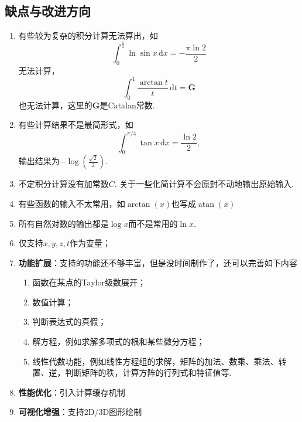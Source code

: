 \documentclass[UTF8,12pt]{ctexart}
\begin{document}
	\subsection{缺点与改进方向}
	\begin{enumerate}
		\item 有些较为复杂的积分计算无法算出，如\[\int_0^{\frac{\pi}2}\ln\sin x\,\mathrm dx=-\frac{\pi\ln 2}2\]无法计算，\[\int_0^1\frac{\arctan t}{t}\,\mathrm dt=\boldsymbol{G}\]也无法计算，这里的$\boldsymbol{G}$是Catalan常数. 
		\item 有些计算结果不是最简形式，如\[\int_0^{\pi/4}\tan x\,\mathrm dx=\frac{\ln 2}2,\]输出结果为$-\log\left(\frac{\sqrt2}2\right).$
		\item 不定积分计算没有加常数$C$.  关于一些化简计算不会原封不动地输出原始输入. 
		\item 有些函数的输入不太常用，如$\arctan(x)$也写成$\operatorname{atan}(x)$
		\item 所有自然对数的输出都是$\log x$而不是常用的$\ln x$.
		\item 仅支持$x,y,z,t$作为变量； 
		\item \textbf{功能扩展}：支持的功能还不够丰富，但是没时间制作了，还可以完善如下内容\begin{enumerate}
			\item 函数在某点的Taylor级数展开；
			\item 数值计算；
			\item 判断表达式的真假；
			\item 解方程，例如求解多项式的根和某些微分方程；
			\item 线性代数功能，例如线性方程组的求解，矩阵的加法、数乘、乘法、转置、逆，判断矩阵的秩，计算方阵的行列式和特征值等. 
		\end{enumerate}
		\item \textbf{性能优化}：引入计算缓存机制
		\item \textbf{可视化增强}：支持2D/3D图形绘制
	\end{enumerate}
	
\end{document}
